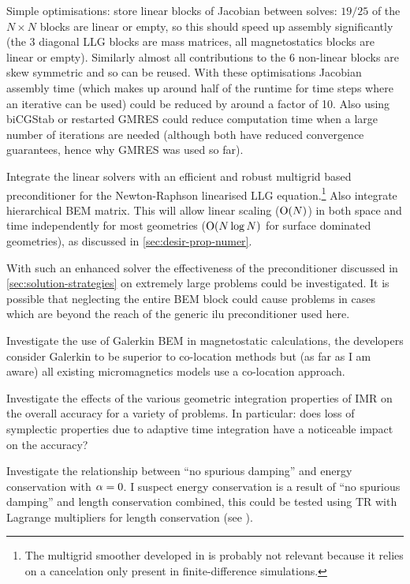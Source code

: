 Simple optimisations: store linear blocks of Jacobian between solves: $19/25$ of the $N \times N$ blocks are linear or empty, so this should speed up assembly significantly (the 3 diagonal LLG blocks are mass matrices, all magnetostatics blocks are linear or empty).
Similarly almost all contributions to the 6 non-linear blocks are skew symmetric and so can be reused.
With these optimisations Jacobian assembly time (which makes up around half of the runtime for time steps where an iterative can be used) could be reduced by around a factor of 10.
Also using biCGStab or restarted GMRES could reduce computation time when a large number of iterations are needed (although both have reduced convergence guarantees, hence why GMRES was used so far).


Integrate the linear solvers with an efficient and robust multigrid based preconditioner for the Newton-Raphson linearised LLG equation.\footnote{The multigrid smoother developed in \cite{Jeong2014} is probably not relevant because it relies on a cancelation only present in finite-difference simulations.}
Also integrate hierarchical BEM matrix.
This will allow linear scaling (\ie $\mathrm{O}{\left( N \right)}$) in both space and time independently for most geometries ($\mathrm{O}{\left( N \log N \right)}$ for surface dominated geometries), as discussed in \cref{sec:desir-prop-numer}.


With such an enhanced solver the effectiveness of the preconditioner discussed in \cref{sec:solution-strategies} on extremely large problems could be investigated.
It is possible that neglecting the entire BEM block could cause problems in cases which are beyond the reach of the generic ilu preconditioner used here.


Investigate the use of Galerkin BEM in magnetostatic calculations, the \hlib developers consider Galerkin to be superior to co-location methods but (as far as I am aware) all existing micromagnetics models use a co-location approach.


Investigate the effects of the various geometric integration properties of IMR on the overall accuracy for a variety of problems.
In particular: does loss of symplectic properties due to adaptive time integration have a noticeable impact on the accuracy?


Investigate the relationship between ``no spurious damping'' and energy conservation with $\alpha = 0$.
I suspect energy conservation is a result of ``no spurious damping'' and length conservation combined, this could be tested using TR with Lagrange multipliers for length conservation (see \eg \cite{Szambolics2008a}).


